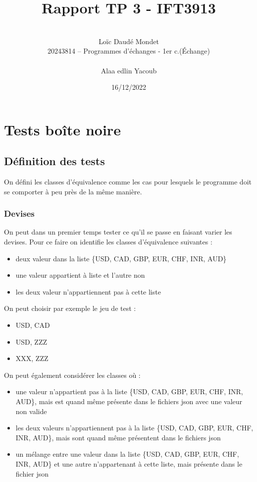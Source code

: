 \documentclass[11pt]{rapport-tp-qlm}
\begin{document}
\title{Rapport TP 3 - IFT3913}

\author{
	\\Loïc Daudé Mondet
	\\20243814 -- Programmes d'échanges - 1er c.(Échange)
	\\
	\\Alaa edlin Yacoub
}

\date{16/12/2022}

\maketitle

\chapter{Tests boîte noire}
\section*{Définition des tests}
On défini les classes d'équivalence comme les cas pour lesquels le programme doit se comporter à peu près de la même manière.
\subsection*{Devises}
On peut dans un premier temps tester ce qu'il se passe en faisant varier les devises. Pour ce faire on identifie les classes d'équivalence suivantes :
\begin{itemize}
  \item deux valeur dans la liste \{USD, CAD, GBP, EUR, CHF, INR, AUD\}
  \item une valeur appartient à liste et l'autre non
  \item les deux valeur n'appartiennent pas à cette liste
\end{itemize}

On peut choisir par exemple le jeu de test : 
\begin{itemize}
  \item USD, CAD
  \item USD, ZZZ
  \item XXX, ZZZ
\end{itemize}

On peut également considérer les classes où : 
\begin{itemize}
  \item une valeur n'appartient pas à la liste \{USD, CAD, GBP, EUR, CHF, INR, AUD\}, mais est quand même présente dans le fichiers json avec une valeur non valide
  \item les deux valeurs n'appartiennent pas à la liste \{USD, CAD, GBP, EUR, CHF, INR, AUD\}, mais sont quand même présentent dans le fichiers json
  \item un mélange entre une valeur dans la liste \{USD, CAD, GBP, EUR, CHF, INR, AUD\} et une autre n'appartenant à cette liste, mais présente dans le fichier json
\end{itemize}
\end{document}
